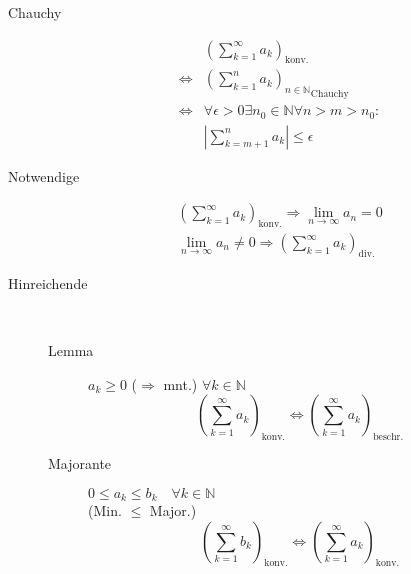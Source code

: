 \begin{description}
  \item [Chauchy]
        $$
          \begin{aligned}
                            & (\sum_{k=1}^\infty a_k)_\text{konv.}                                  \\
            \Leftrightarrow & {(\sum_{k=1}^n a_k)_{n \in \mathbb{N}}}_\text{Chauchy}                \\
            \Leftrightarrow & \forall \epsilon > 0 \exists n_0 \in \mathbb{N} \forall n > m > n_0 : \\
                            & | \sum_{k=m + 1}^n a_k | \leq \epsilon
          \end{aligned}
        $$

  \item [Notwendige]
        $$
          \begin{aligned}
            (\sum_{k=1}^\infty a_k)_\text{konv.} \Rightarrow \lim_{n \rightarrow \infty} a_n = 0 \\
            \lim_{n \rightarrow \infty} a_n \neq 0 \Rightarrow (\sum_{k=1}^\infty a_k)_\text{div.}
          \end{aligned}
        $$

  \item [Hinreichende]\
        \begin{description}
          \item [Lemma] $a_k \geq 0$ ($\Rightarrow$ mnt.) $\forall k \in \mathbb{N}$
                $$(\sum_{k=1}^\infty a_k)_\text{konv.} \Leftrightarrow (\sum_{k=1}^\infty a_k)_\text{beschr.}$$

          \item [Majorante]
                $0 \leq a_k \leq b_k \quad \forall k \in \mathbb{N}$\\
                (Min. $\leq$ Major.)
                $$(\sum_{k=1}^\infty b_k)_\text{konv.} \Leftrightarrow (\sum_{k=1}^\infty a_k)_\text{konv.}$$
        \end{description}
\end{description}